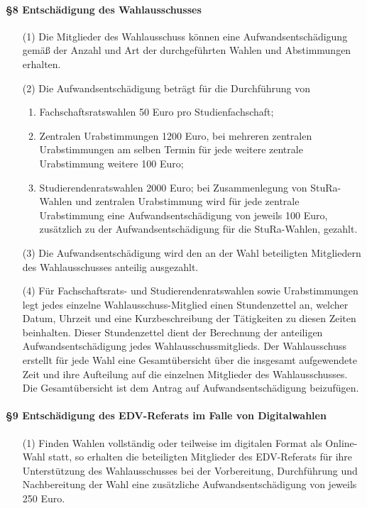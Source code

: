         \paragraph{§8 Entschädigung des Wahlausschusses}
            \begin{itemize}
                \item[(1)]  Die Mitglieder des Wahlausschuss können eine Aufwandsentschädigung gemäß der Anzahl und Art der durchgeführten Wahlen und Abstimmungen erhalten.
                \item[(2)] Die Aufwandsentschädigung beträgt für die Durchführung von
                    \begin{enumerate}
                        \item   Fachschaftsratswahlen 50 Euro pro Studienfachschaft; 
                        \item   Zentralen Urabstimmungen 1200 Euro, bei mehreren zentralen Urabstimmungen am selben Termin für jede weitere zentrale Urabstimmung weitere 100 Euro; 
                        \item   Studierendenratswahlen 2000 Euro; bei Zusammenlegung von StuRa-Wahlen und zentralen Urabstimmung wird für jede zentrale Urabstimmung eine Aufwandsentschädigung von jeweils 100 Euro, zusätzlich zu der Aufwandsentschädigung für die StuRa-Wahlen, gezahlt.
                    \end{enumerate}
                \item[(3)] Die Aufwandsentschädigung wird den an der Wahl beteiligten Mitgliedern des Wahlausschusses anteilig ausgezahlt. 
                \item[(4)] Für Fachschaftsrats- und Studierendenratswahlen sowie Urabstimmungen legt jedes einzelne Wahlausschuss-Mitglied einen Stundenzettel an, welcher Datum, Uhrzeit und eine Kurzbeschreibung der Tätigkeiten zu diesen Zeiten beinhalten. Dieser Stundenzettel dient der Berechnung der anteiligen Aufwandsentschädigung jedes Wahlausschussmitglieds. Der Wahlausschuss erstellt für jede Wahl eine Gesamtübersicht über die insgesamt aufgewendete Zeit und ihre Aufteilung auf  die einzelnen Mitglieder des Wahlausschusses. Die Gesamtübersicht ist dem Antrag auf Aufwandsentschädigung beizufügen.
            \end{itemize}
        \paragraph{§9 Entschädigung des EDV-Referats im Falle von Digitalwahlen}
            \begin{itemize}
                \item[(1)] Finden Wahlen vollständig oder teilweise im digitalen Format als Online-Wahl statt, so erhalten die beteiligten Mitglieder des EDV-Referats für ihre Unterstützung des Wahlausschusses bei der Vorbereitung, Durchführung und Nachbereitung der Wahl eine zusätzliche Aufwandsentschädigung von jeweils 250 Euro.
            \end{itemize}

